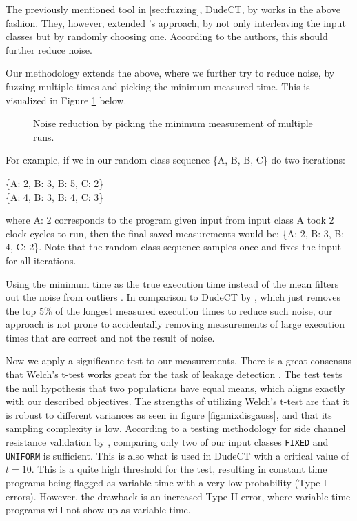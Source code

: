 The previously mentioned tool in \ref{sec:fuzzing}, DudeCT, by \citeauthor{dudect} works in the above fashion. They, however, extended \citeauthor{Coron_2004}'s approach, by not only interleaving the input classes but by randomly choosing one. According to the authors, this should further reduce noise.

Our methodology extends the above, where we further try to reduce noise, by fuzzing multiple times and picking the minimum measured time. This is visualized in Figure \ref{fig:noisered} below. 
\begin{figure}[H]
    \centering
    
    \caption{Noise reduction by picking the minimum measurement of multiple runs.}
    \label{fig:noisered}
\end{figure}
For example, if we in our random class sequence \{A, B, B, C\} do two iterations:
\begin{center}
    \{A: 2, B: 3, B: 5, C: 2\} \\
    \{A: 4, B: 3, B: 4, C: 3\}
\end{center}
where A: 2 corresponds to the program given input from input class A took 2 clock cycles to run, then the final saved measurements would be: \{A: 2, B: 3, B: 4, C: 2\}. Note that the random class sequence samples once and fixes the input for all iterations.

Using the minimum time as the true execution time instead of the mean filters out the noise from outliers  \cite{robust-benchmarking}.
In comparison to DudeCT by \citeauthor{dudect}, which just removes the top 5\% of the longest measured execution times to reduce such noise, our approach is not prone to accidentally removing measurements of large execution times that are correct and not the result of noise.

Now we apply a significance test to our measurements. There is a great consensus that Welch's t-test \cite{WELCH1947} works great for the task of leakage detection \cite{cryptoeprint:2015/536}.
The test tests the null hypothesis that two populations have equal means, which aligns exactly with our described objectives. The strengths of utilizing Welch's t-test are that it is robust to different variances as seen in figure \ref{fig:mixdisgauss}, and that its sampling complexity is low. According to a testing methodology for side channel resistance validation by \citeauthor{Goodwill2011ATM}, comparing only two of our input classes \texttt{FIXED} and \texttt{UNIFORM} is sufficient.
This is also what is used in DudeCT \cite{dudect} with a critical value of $t = 10$. 
This is a quite high threshold for the test, resulting in constant time programs being flagged as variable time with a very low probability (Type I errors).
However, the drawback is an increased Type II error, where variable time programs will not show up as variable time.

